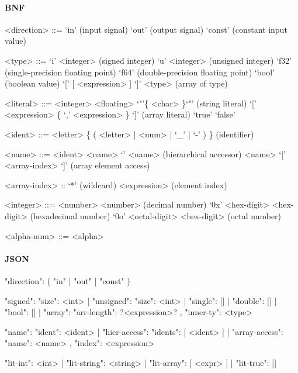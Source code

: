 \documentclass{article}
\begin{document}
\paragraph{BNF}
\begin{grammar}

  <direction> ::= `in' (input signal)
  \alt `out' (output signal)
  \alt `const' (constant input value)

  <type> ::= `i' <integer> (signed integer)
  \alt `u' <integer> (unsigned integer)
  \alt `f32' (single-precision floating point)
  \alt `f64' (double-precision floating point)
  \alt `bool' (boolean value)
  \alt `[' [ <expression> ] `]' <type> (array of type)


  <literal> ::= <integer>
  \alt <floating>
  \alt `"'\{ <char> \}`"' (string literal)
  \alt `[' <expression> \{ `,' <expression> \} `]' (array literal)
  \alt `true'
  \alt `false'

  <ident> ::= <letter> \{ ( <letter> | <num> | `_' | `-' ) \} (identifier)

  <name> ::= <ident>
  \alt <name> `.' <name> (hierarchical accessor)
  \alt <name> `[' <array-index> `]' (array element access)

  <array-index> :: `*' (wildcard)
  \alt <expression> (element index)

  <integer> ::= <number> { <number> } (decimal number)
  \alt `0x' <hex-digit> { <hex-digit> } (hexadecimal number)
  \alt `0o' <octal-digit> { <hex-digit> } (octal number)

  <alpha-num> ::= <alpha>

\end{grammar}

\paragraph{JSON}
\begin{jsoncode}
{"direction": ( "in"
              | "out"
              | "const" )
}

{ "signed": { "size": <int> }
| "unsigned": { "size": <int> }
| "single": []
| "double": []
| "bool": []
| "array": { "arr-length": ?<expression>?
           , "inner-ty": <type>
           }
}

{ "name": { "ident": <ident> }
| "hier-access": { "idents": [ <ident> ] }
| "array-access": { "name": <name>
                  , "index": <expression>
                  }
}

{ "lit-int": <int>
| "lit-string": <string>
| "lit-array": [ <expr> ]
| "lit-true": []
}
\end{jsoncode}
\end{document}
